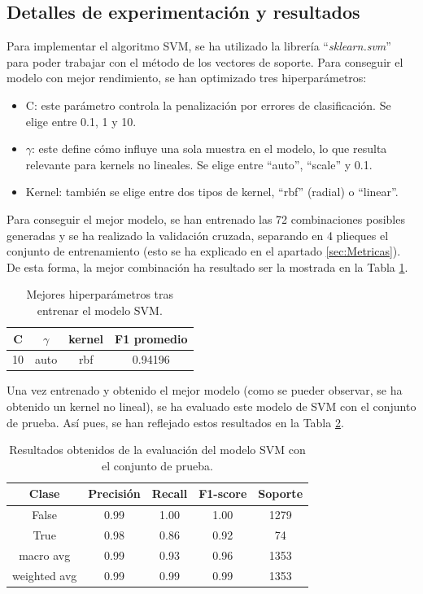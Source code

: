 \documentclass[12pt,letterpaper]{article}
\begin{document}
\subsection{ Detalles de experimentación y resultados}

Para implementar el algoritmo SVM, se ha utilizado la librería ``\textit{sklearn.svm}'' para poder trabajar con el método de los vectores de soporte. Para conseguir el modelo con mejor rendimiento, se han optimizado tres hiperparámetros: 

\begin{itemize}
    \item C: este parámetro controla la penalización por errores de clasificación. Se elige entre 0.1, 1 y 10.
    \item $\gamma$: este define cómo influye una sola muestra en el modelo, lo que resulta relevante para kernels no lineales. Se elige entre ``auto'', ``scale'' y 0.1.
    \item Kernel: también se elige entre dos tipos de kernel, ``rbf'' (radial) o ``linear''.
\end{itemize}

Para conseguir el mejor modelo, se han entrenado las 72 combinaciones posibles generadas y se ha realizado la validación cruzada, separando en 4 plieques el conjunto de entrenamiento (esto se ha explicado en el apartado \ref{sec:Metricas}). De esta forma, la mejor combinación ha resultado ser la mostrada en la Tabla \ref{tab:hiper-SVM}.
\begin{table}[H]
    \centering
    \begin{tabular}{ccc|c}
     \hline
     \textbf{C} & $\gamma$ & \textbf{kernel} & F1 promedio \\ \hline
     10 & auto & rbf & 0.94196 \\ \hline
    \end{tabular}
    \caption{Mejores hiperparámetros tras entrenar el modelo SVM.}
    \label{tab:hiper-SVM}
\end{table}

Una vez entrenado y obtenido el mejor modelo (como se pueder observar, se ha obtenido un kernel no lineal), se ha evaluado este modelo de SVM con el conjunto de prueba. Así pues, se han reflejado estos resultados en la Tabla \ref{tab:res-SVM}.
\begin{table}[H]
    \centering
    \begin{tabular}{ccccc}
    \hline
    \textbf{Clase} & \textbf{Precisión} & \textbf{Recall} & \textbf{F1-score} & \textbf{Soporte} \\ \hline
    False & 0.99 & 1.00 & 1.00 & 1279 \\ 
    True & 0.98 &  0.86 & 0.92 & 74 \\ 
    macro avg & 0.99 & 0.93 & 0.96 & 1353 \\ 
    weighted avg & 0.99 &  0.99 & 0.99 & 1353 \\ \hline
    \end{tabular}
    \caption{Resultados obtenidos de la evaluación del modelo SVM con el conjunto de prueba.}
    \label{tab:res-SVM}
\end{table}
\end{document}
